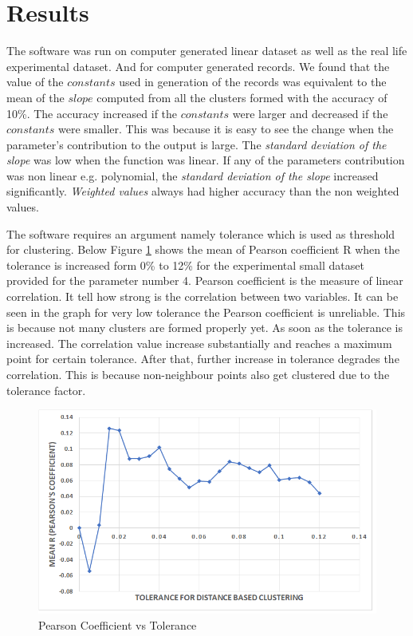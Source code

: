 \section{Results}

The software was run on computer generated linear dataset as well as the real life experimental dataset. And for computer generated records. We found that the value of the \(constants\) used in generation of the records was equivalent to the mean of the \(slope\) computed from all the clusters formed with the accuracy of 10\%. The accuracy increased if the \(constants\) were larger and decreased if the \(constants\) were smaller. This was because it is easy to see the change when the parameter's contribution to the output is large. The \textit{standard deviation of the slope} was low when the function was linear. If any of the parameters contribution was non linear e.g. polynomial, the \textit{standard deviation of the slope} increased significantly. \textit{Weighted values} always had higher accuracy than the non weighted values.

The software requires an argument namely tolerance which is used as threshold for clustering. Below Figure \ref{fig:linegraph} shows the mean of Pearson coefficient R when the tolerance is increased form 0\% to 12\% for the experimental small dataset provided for the parameter number 4. Pearson coefficient is the measure of linear correlation. It tell how strong is the correlation between two variables. It can be seen in the graph for very low tolerance the Pearson coefficient is unreliable. This is because not many clusters are formed properly yet. As soon as the tolerance is increased. The correlation value increase substantially and reaches a maximum point for certain tolerance. After that, further increase in tolerance degrades the correlation. This is because non-neighbour points also get clustered due to the tolerance factor.

\begin{figure}[!ht]
	\centering
	\includegraphics[width=400pt]{linegraph}
	\caption{\label{fig:linegraph} Pearson Coefficient vs Tolerance}
\end{figure}

